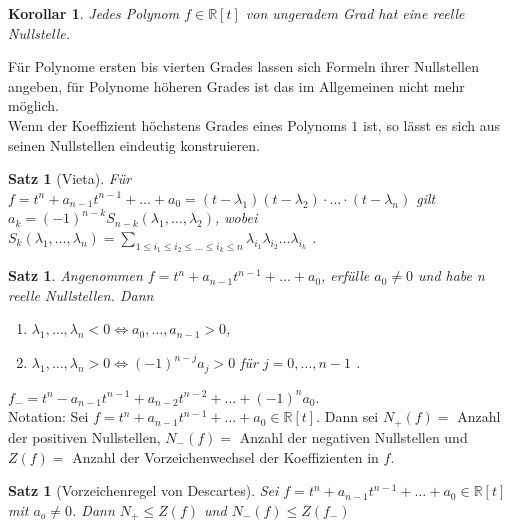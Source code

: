 \documentclass[12pt,a4paper]{article}
\theoremstyle{plain}
\newtheorem{Satz}[Theorem]{Satz}
\newtheorem{Korollar}[Theorem]{Korollar}
\newcommand{\R}{\mathbb{R}}
\numberwithin{equation}{section}
\begin{document}
\begin{Korollar}
Jedes Polynom $f\in\R[t]$ von ungeradem Grad hat eine reelle Nullstelle.
\end{Korollar}
Für Polynome ersten bis vierten Grades lassen sich Formeln ihrer Nullstellen angeben, für Polynome höheren Grades ist das im Allgemeinen nicht mehr möglich.\\
Wenn der Koeffizient höchstens Grades eines Polynoms $1$ ist, so lässt es sich aus seinen Nullstellen eindeutig konstruieren.
\begin{Satz}[Vieta]
Für $f=t^n+a_{n-1}t^{n-1}+\ldots+a_0=(t-\lambda_1)(t-\lambda_2)\cdot\ldots\cdot(t-\lambda_n)$ gilt $a_k=(-1)^{n-k}S_{n-k}(\lambda_1,\ldots,\lambda_2)$, wobei $S_k(\lambda_1,\ldots,\lambda_n)=\sum_{1\leq i_1\leq i_2\leq\ldots\leq i_k\leq n}{\lambda_{i_1}\lambda_{i_2}\ldots\lambda_{i_k}}$ .
\end{Satz}
\begin{Satz}
Angenommen $f=t^n+a_{n-1}t^{n-1}+\ldots+a_0$, erfülle $a_0\neq 0$ und habe n reelle Nullstellen. Dann
\begin{enumerate}
\renewcommand{\labelenumi}{\emph{(\alph{enumi})}}
\item $\lambda_1,\ldots,\lambda_n<0 \Leftrightarrow a_0,\ldots,a_{n-1}>0$,
\item $\lambda_1,\ldots,\lambda_n>0 \Leftrightarrow (-1)^{n-j}a_j>0$ für $j=0,\ldots,n-1$ .
\end{enumerate}
\end{Satz}
$f_{-}=t^n-a_{n-1}t^{n-1}+a_{n-2}t^{n-2}+\ldots+(-1)^n a_0$.\\
Notation: Sei $f=t^n+a_{n-1}t^{n-1}+\ldots+a_0\in\R[t]$. Dann sei $N_{+}(f) = $ Anzahl der positiven Nullstellen, $N_{-}(f) = $ Anzahl der negativen Nullstellen und $Z(f) = $ Anzahl der Vorzeichenwechsel der Koeffizienten in $f$.
\begin{Satz}[Vorzeichenregel von Descartes]
Sei $f=t^n+a_{n-1}t^{n-1}+\ldots+a_0\in\R[t]$ mit $a_o\neq 0$. Dann $N_{+}\leq Z(f)$ und $N_{-}(f)\leq Z(f_{-})$
\end{Satz}
\end{document}

